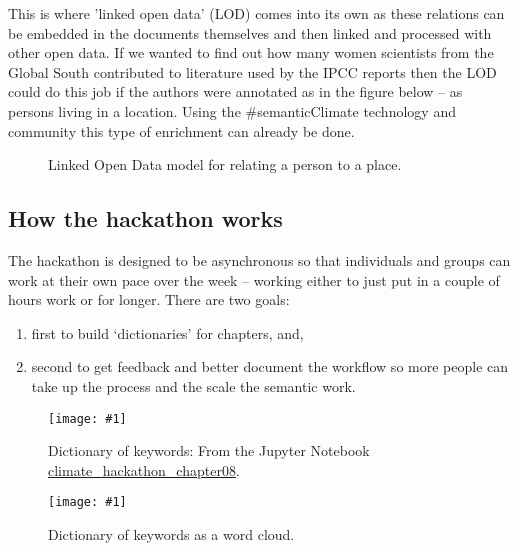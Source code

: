 \documentclass{article}
\newlength{\imgwidth}
\newcommand\scaledgraphics[2]{%
                
\settowidth{\imgwidth}{\texttt{[image: \#1]}}%
                
\setlength{\imgwidth}{\minof{\imgwidth}{#2\textwidth}}%
                
\texttt{[image: \#1]}%
                
}
\begin{document}
This is where 'linked open data' (LOD) comes into its own as these relations can be embedded in the documents themselves and then linked and processed with other open data. If we wanted to find out how many women scientists from the Global South contributed to literature used by the IPCC reports then the LOD could do this job if the authors were annotated as in the figure below – as persons living in a location. Using the \#semanticClimate technology and community this type of enrichment can already be done.

\begin{figure}

\caption*{Linked Open Data model for relating a person to a place.}\label{F44119581}
\end{figure}


\subsection{How the hackathon works}\label{H1972442}



The hackathon is designed to be asynchronous so that individuals and groups can work at their own pace over the week – working either to just put in a couple of hours work or for longer. There are two goals: 

\begin{enumerate}
\item first to build ‘dictionaries’ for chapters, and, 


\item second to get feedback and better document the workflow so more people can take up the process and the scale the semantic work.


\end{enumerate}
\begin{figure}
\scaledgraphics{2a688feb-023c-406f-b775-9abbb13eea6f.png}{1}
\caption*{Dictionary of keywords: From the Jupyter Notebook \href{https://github.com/petermr/semanticClimate/blob/main/outreach/climate_knowledge_hunt_hackathon/Hackathon_Notebook/climate_hackathon_chapter08.ipynb}{climate\_hackathon\_chapter08}.}\label{F54937981}
\end{figure}

\begin{figure}
\scaledgraphics{a7c097f0-2a0a-491e-a876-d67318692d2a.png}{1}
\caption*{Dictionary of keywords as a word cloud. }\label{F22082871}
\end{figure}
\end{document}

